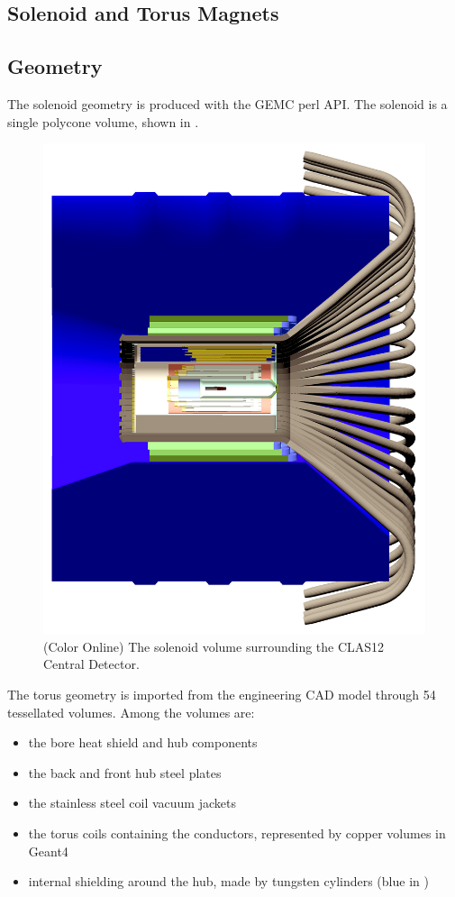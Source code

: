\subsection{Solenoid and Torus Magnets}


\subsection{Geometry}
The solenoid geometry is produced with the GEMC perl API. The solenoid is a single polycone volume, shown in .
\begin{figure}[h]
	\centering
	\includegraphics[width=0.99\columnwidth,keepaspectratio]{img/solenoid.png}
    \caption{(Color Online) The solenoid volume surrounding the CLAS12 Central Detector.}
	\label{fig:solenoid}
\end{figure}

The torus geometry is imported from the engineering CAD model through 54 tessellated volumes. Among the volumes are:

\begin{itemize}
	\item the bore heat shield and hub components
	\item the back and front hub steel plates
	\item the stainless steel coil vacuum jackets
	\item the torus coils containing the conductors, represented by copper volumes in Geant4
	\item internal shielding around the hub, made by tungsten cylinders (blue in )
\end{itemize}


